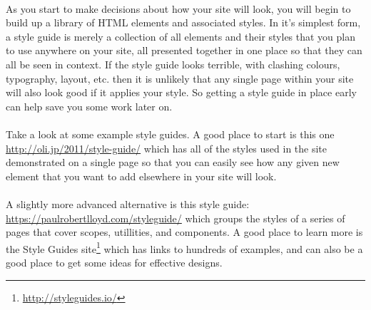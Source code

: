 \documentclass[10pt, a4paper]{article}
\begin{document}
\paragraph{} As you start to make decisions about how your site will look, you will begin to build up a library of HTML elements and associated styles. In it's simplest form, a style guide is merely a collection of all elements and their styles that you plan to use anywhere on your site, all presented together in one place so that they can all be seen in context. If the style guide looks terrible, with clashing colours, typography, layout, etc. then it is unlikely that any single page within your site will also look good if it applies your style. So getting a style guide in place early can help save you some work later on.

\paragraph{} Take a look at some example style guides. A good place to start is this one \url{http://oli.jp/2011/style-guide/} which has all of the styles used in the site demonstrated on a single page so that you can easily see how any given new element that you want to add elsewhere in your site will look.

\paragraph{} A slightly more advanced alternative is this style guide: \url{https://paulrobertlloyd.com/styleguide/} which groups the styles of a series of pages that cover scopes, utillities, and components. A good place to learn more is the Style Guides site\footnote{\url{http://styleguides.io/}} which has links to hundreds of examples, and can also be a good place to get some ideas for effective designs.
\end{document}
